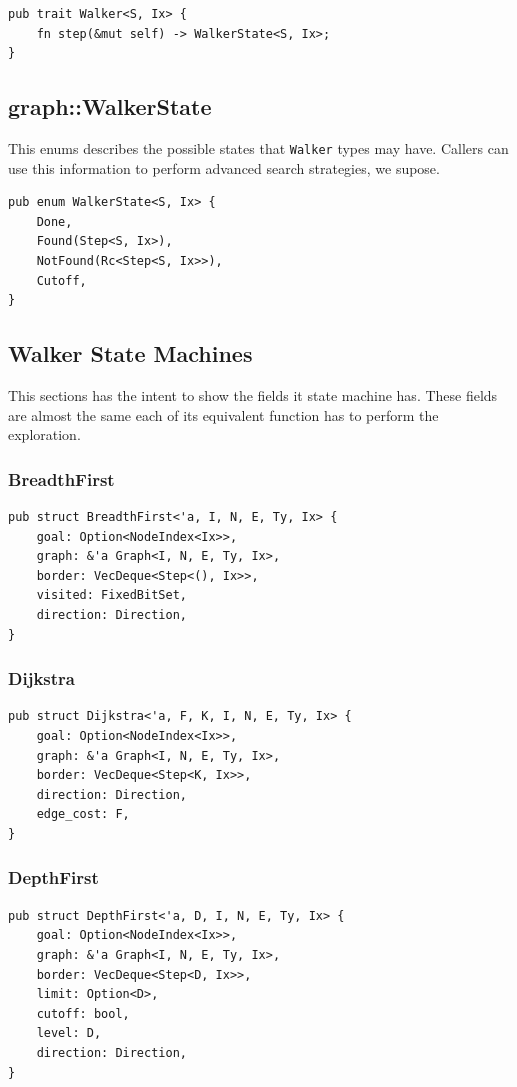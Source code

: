 \begin{verbatim}
pub trait Walker<S, Ix> {
    fn step(&mut self) -> WalkerState<S, Ix>;
}
\end{verbatim}

\subsection{graph::WalkerState}

This enums describes the possible states that \texttt{Walker} types may have. Callers can use this information
to perform advanced search strategies, we supose.

\begin{verbatim}
pub enum WalkerState<S, Ix> {
    Done,
    Found(Step<S, Ix>),
    NotFound(Rc<Step<S, Ix>>),
    Cutoff,
}
\end{verbatim}

\subsection{Walker State Machines}

This sections has the intent to show the fields it state machine has. These fields are almost the same
each of its equivalent function has to perform the exploration.

\subsubsection{BreadthFirst}
\begin{verbatim}
pub struct BreadthFirst<'a, I, N, E, Ty, Ix> {
    goal: Option<NodeIndex<Ix>>,
    graph: &'a Graph<I, N, E, Ty, Ix>,
    border: VecDeque<Step<(), Ix>>,
    visited: FixedBitSet,
    direction: Direction,
}
\end{verbatim}

\subsubsection{Dijkstra}
\begin{verbatim}
pub struct Dijkstra<'a, F, K, I, N, E, Ty, Ix> {
    goal: Option<NodeIndex<Ix>>,
    graph: &'a Graph<I, N, E, Ty, Ix>,
    border: VecDeque<Step<K, Ix>>,
    direction: Direction,
    edge_cost: F,
}
\end{verbatim}

\subsubsection{DepthFirst}
\begin{verbatim}
pub struct DepthFirst<'a, D, I, N, E, Ty, Ix> {
    goal: Option<NodeIndex<Ix>>,
    graph: &'a Graph<I, N, E, Ty, Ix>,
    border: VecDeque<Step<D, Ix>>,
    limit: Option<D>,
    cutoff: bool,
    level: D,
    direction: Direction,
}
\end{verbatim}


